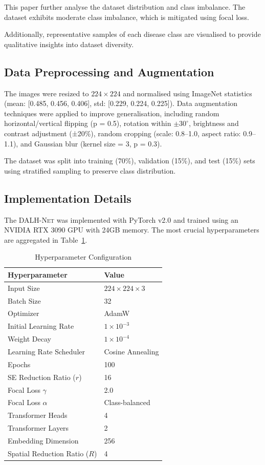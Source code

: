 \documentclass[default, iicol]{sn-jnl}
\theoremstyle{thmstyleone}%
\theoremstyle{thmstyletwo}%
\theoremstyle{thmstylethree}%
\newcommand{\dalh}{\textsc{DALH-Net}}
\begin{document}
This paper further analyse the dataset distribution and class imbalance. The dataset exhibits moderate class imbalance, which is mitigated using focal loss.

Additionally, representative samples of each disease class are visualised to provide qualitative insights into dataset diversity.


\subsection{Data Preprocessing and Augmentation}

The images were resized to $224 \times 224$ and normalised using ImageNet statistics (mean: [0.485, 0.456, 0.406], std: [0.229, 0.224, 0.225]). Data augmentation techniques were applied to improve generalisation, including random horizontal/vertical flipping (p = 0.5), rotation within $\pm 30^\circ$, brightness and contrast adjustment (±20\%), random cropping (scale: 0.8–1.0, aspect ratio: 0.9–1.1), and Gaussian blur (kernel size = 3, p = 0.3).

The dataset was split into training (70\%), validation (15\%), and test (15\%) sets using stratified sampling to preserve class distribution.

\subsection{Implementation Details}

The \dalh{} was implemented with PyTorch v2.0 and trained using an NVIDIA RTX 3090 GPU with 24GB memory. The most crucial hyperparameters are aggregated in Table~\ref{tab:hyperparams}.

\begin{table}[htbp]
\centering
\caption{Hyperparameter Configuration}
\label{tab:hyperparams}
\begin{tabular}{|l|l|}
\toprule
\textbf{Hyperparameter} & \textbf{Value} \\
\midrule
Input Size & $224 \times 224 \times 3$ \\
Batch Size & 32 \\
Optimizer & AdamW \\
Initial Learning Rate & $1 \times 10^{-3}$ \\
Weight Decay & $1 \times 10^{-4}$ \\
Learning Rate Scheduler & Cosine Annealing \\
Epochs & 100 \\
SE Reduction Ratio ($r$) & 16 \\
Focal Loss $\gamma$ & 2.0 \\
Focal Loss $\alpha$ & Class-balanced \\
Transformer Heads & 4 \\
Transformer Layers & 2 \\
Embedding Dimension & 256 \\
Spatial Reduction Ratio ($R$) & 4 \\
\bottomrule
\end{tabular}
\end{table}
\end{document}
